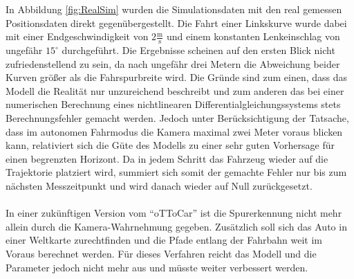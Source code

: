 In Abbildung \ref{fig:RealSim} wurden die Simulationsdaten mit den real gemessen Positionsdaten direkt gegenübergestellt. Die Fahrt einer Linkskurve wurde dabei mit einer Endgeschwindigkeit von $2\frac{\text{m}}{\text{s}}$ und einem konstanten Lenkeinschlag von ungefähr $15^\circ$ durchgeführt. Die Ergebnisse scheinen auf den ersten Blick nicht zufriedenstellend zu sein, da nach ungefähr drei Metern die Abweichung beider Kurven größer als die Fahrspurbreite wird. Die Gründe sind zum einen, dass das Modell die Realität nur unzureichend beschreibt und zum anderen das bei einer numerischen Berechnung eines nichtlinearen Differentialgleichungssystems stets Berechnungsfehler gemacht werden. Jedoch unter Berücksichtigung der Tatsache, dass im autonomen Fahrmodus die Kamera maximal zwei Meter voraus blicken kann, relativiert sich die Güte des Modells zu einer sehr guten Vorhersage für einen begrenzten Horizont. Da in jedem Schritt das Fahrzeug wieder auf die Trajektorie platziert wird, summiert sich somit der gemachte Fehler nur bis zum nächsten Messzeitpunkt und wird danach wieder auf Null zurückgesetzt. \\ \\
In einer zukünftigen Version vom "`oTToCar"' ist die Spurerkennung nicht mehr allein durch die Kamera-Wahrnehmung gegeben. Zusätzlich soll sich das Auto in einer Weltkarte zurechtfinden und die Pfade entlang der Fahrbahn weit im Voraus berechnet werden. Für dieses Verfahren reicht das Modell und die Parameter jedoch nicht mehr aus und müsste weiter verbessert werden.